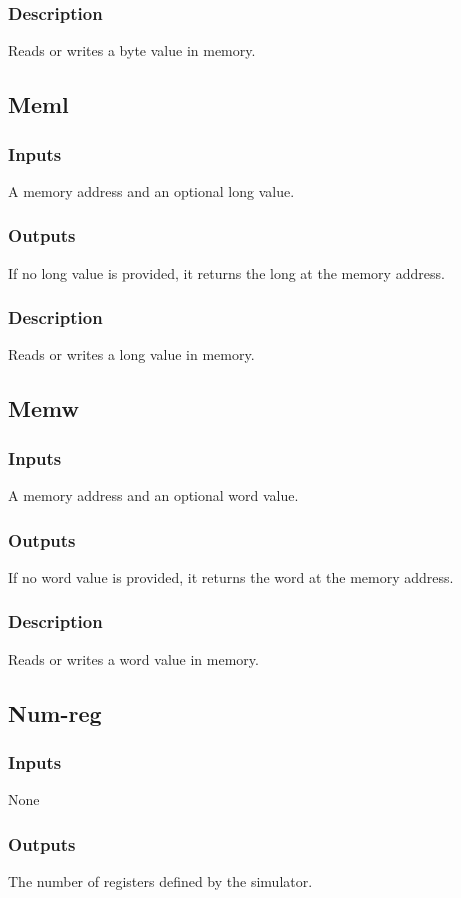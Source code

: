 \documentclass[10pt, openany]{book}
\begin{document}
\subsubsection{Description}
Reads or writes a byte value in memory.

\subsection{Meml}
\subsubsection{Inputs}
A memory address and an optional long value.
\subsubsection{Outputs}
If no long value is provided, it returns the long at the memory address.
\subsubsection{Description}
Reads or writes a long value in memory.

\subsection{Memw}
\subsubsection{Inputs}
A memory address and an optional word value.
\subsubsection{Outputs}
If no word value is provided, it returns the word at the memory address.
\subsubsection{Description}
Reads or writes a word value in memory.

\subsection{Num-reg}
\subsubsection{Inputs}
None
\subsubsection{Outputs}
The number of registers defined by the simulator.
\end{document}

